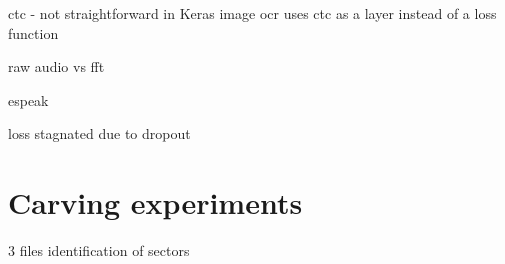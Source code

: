 \todo[inline]{}
\todo[inline]{}
\todo[inline]{}


ctc - not straightforward in Keras
image ocr uses ctc as a layer instead of a loss function

raw audio vs fft

espeak

loss stagnated due to dropout

\section{Carving experiments}
3 files
identification of sectors
